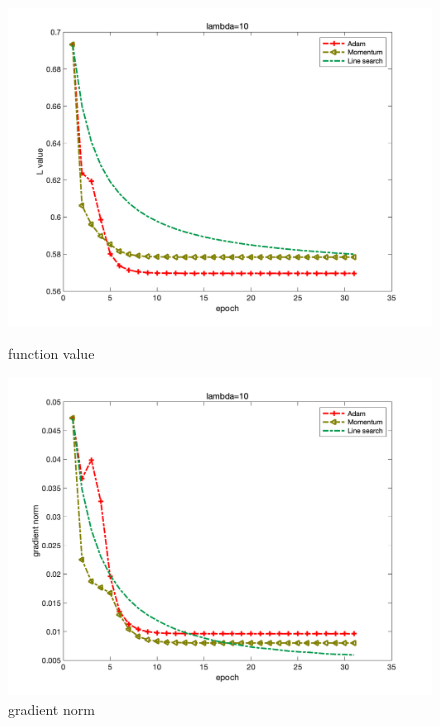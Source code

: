 \documentclass{article}
\begin{document}
\begin{figure}[H]
	\begin{minipage}{0.33\linewidth}
		\centering
		\includegraphics[width=1\linewidth]{./fig/fval_c1}
		\caption{function value}
	\end{minipage}
	\begin{minipage}{0.33\linewidth}
		\centering
		\includegraphics[width=1\linewidth]{./fig/gnorm_c1}
		\caption{gradient norm}
	\end{minipage}
	\begin{minipage}{0.33\linewidth}
		\centering

\end{minipage}
\end{figure}
\end{document}
